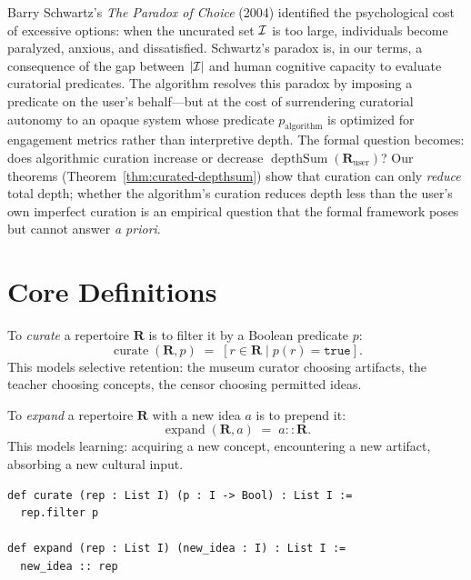 Barry Schwartz's \textit{The Paradox of Choice} (2004) identified the
psychological cost of excessive options: when the uncurated set $\mathcal{I}$ is
too large, individuals become paralyzed, anxious, and dissatisfied.
Schwartz's paradox is, in our terms, a consequence of the gap between
$|\mathcal{I}|$ and human cognitive capacity to evaluate curatorial predicates.
The algorithm resolves this paradox by imposing a predicate on the user's
behalf---but at the cost of surrendering curatorial autonomy to an opaque
system whose predicate $p_{\text{algorithm}}$ is optimized for engagement
metrics rather than interpretive depth.  The formal question becomes:
does algorithmic curation increase or decrease
$\operatorname{depthSum}(\mathbf{R}_{\text{user}})$?  Our theorems
(Theorem~\ref{thm:curated-depthsum}) show that curation can only
\emph{reduce} total depth; whether the algorithm's curation reduces
depth less than the user's own imperfect curation is an empirical
question that the formal framework poses but cannot answer
\textit{a priori}.

\section{Core Definitions}
\label{sec:ch15-defs}

\begin{definition}[Curation]
\label{def:curate}
To \emph{curate} a repertoire $\mathbf{R}$ is to filter it by a Boolean
predicate $p$:
\[
  \operatorname{curate}(\mathbf{R}, p)
  \;=\; [r \in \mathbf{R} \mid p(r) = \texttt{true}].
\]
This models selective retention: the museum curator choosing artifacts, the
teacher choosing concepts, the censor choosing permitted ideas.
\end{definition}

\begin{definition}[Expansion]
\label{def:expand}
To \emph{expand} a repertoire $\mathbf{R}$ with a new idea $a$ is to
prepend it:
\[
  \operatorname{expand}(\mathbf{R}, a) \;=\; a :: \mathbf{R}.
\]
This models learning: acquiring a new concept, encountering a new artifact,
absorbing a new cultural input.
\end{definition}

\begin{lstlisting}[caption={Curation and expansion in Lean~4}]
def curate (rep : List I) (p : I -> Bool) : List I :=
  rep.filter p

def expand (rep : List I) (new_idea : I) : List I :=
  new_idea :: rep
\end{lstlisting}


